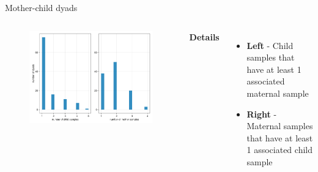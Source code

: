
\begin{frame}{Mother-child dyads}
    \begin{columns}[c] %

    
        \begin{figure}
        \includegraphics[width=1\linewidth]{../figures/dyads}
        \end{figure}

    
        \textbf{Details}
        \begin{itemize}
            \item \textbf{Left} - Child samples that have at least 1 associated maternal sample
            \item \textbf{Right} - Maternal samples that have at least 1 associated child sample
        \end{itemize}

    \end{columns}

\end{frame}


